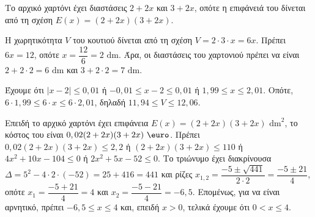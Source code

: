 
\begin{alist}
\item Το αρχικό χαρτόνι έχει διαστάσεις $2 + 2x$ και $3 + 2x$, οπότε η επιφάνειά του δίνεται από τη σχέση $E(x) = (2 + 2x)(3 + 2x)$.

\item
\begin{rlist}
\item Η χωρητικότητα $V$ του κουτιού δίνεται από τη σχέση $V = 2 \cdot 3 \cdot x = 6x$. Πρέπει
$6x = 12$, οπότε $x = \dfrac{12}{6} = 2\text{ dm}$. Άρα, οι διαστάσεις του χαρτονιού πρέπει να είναι
$2 + 2 \cdot 2 = 6\text{ dm}$ και $3 + 2 \cdot 2 = 7\text{ dm}$.
\item Έχουμε ότι
$|x - 2| \le 0,01$
ή
$-0,01 \le x - 2 \le 0,01$
ή
$1,99 \le x \le 2,01$.
Οπότε, $6 \cdot 1,99 \le 6 \cdot x \le 6 \cdot 2,01$, δηλαδή $11,94 \le V \le 12,06$.
\end{rlist}

\item Επειδή το αρχικό χαρτόνι έχει επιφάνεια $E(x) = (2 + 2x)(3 + 2x)\text{ dm}^2$, το κόστος του
είναι $0,02(2 + 2x)(3 + 2x)\text{ \euro}$. Πρέπει
$0,02(2 + 2x)(3 + 2x) \le 2,2$
ή
$(2 + 2x)(3 + 2x) \le 110$
ή
$4x^2 + 10x - 104 \le 0$
ή
$2x^2 + 5x - 52 \le 0$.
Το τριώνυμο έχει διακρίνουσα $\Delta = 5^2 - 4 \cdot 2 \cdot (-52) = 25 + 416 = 441$ και ρίζες $x_{1,2} = \dfrac{-5 \pm \sqrt{441}}{2 \cdot 2} = \dfrac{-5 \pm 21}{4}$, οπότε $x_1 = \dfrac{-5 + 21}{4} = 4$ και $x_2 = \dfrac{-5 - 21}{4} = -6,5$. Επομένως, για να είναι αρνητικό,
πρέπει $-6,5 \le x \le 4$ και, επειδή $x > 0$, τελικά έχουμε ότι $0 < x \le 4$.
\end{alist}


